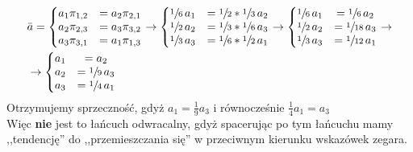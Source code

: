 \begin{align*}
&\bar{a}=\left\{\begin{matrix}
a_1\pi _{1,2} &= a_2\pi _{2,1}\\
a_2\pi _{2,3} &= a_3\pi _{3,2}\\
a_3\pi _{3,1} &= a_1\pi _{1,3}
\end{matrix}\right. \rightarrow \left\{\begin{matrix}
\sfrac{1}{6}\,a_1 &= \sfrac{1}{2}*\sfrac{1}{3}\,a_2\\
\sfrac{1}{2}\,a_2 &= \sfrac{1}{3}*\sfrac{1}{6}\,a_3\\
\sfrac{1}{3}\,a_3 &= \sfrac{1}{6}*\sfrac{1}{2}\,a_1
\end{matrix}\right. \rightarrow \left\{\begin{matrix}
\sfrac{1}{6}\,a_1 &= \sfrac{1}{6}\,a_2\\
\sfrac{1}{2}\,a_2 &= \sfrac{1}{18}\,a_3\\
\sfrac{1}{3}\,a_3 &= \sfrac{1}{12}\,a_1
\end{matrix}\right.\rightarrow \\
&\rightarrow \left\{\begin{matrix}
a_1 &= a_2\\
a_2 &= \sfrac{1}{9}\,a_3\\
a_3 &= \sfrac{1}{4}\,a_1
\end{matrix}\right.
\end{align*}
Otrzymujemy sprzeczność, gdyż  $a_1 = \frac{1}{9}a_3$ i równocześnie $\frac{1}{4}a_1 = a_3$\\
Więc \textbf{nie} jest to łańcuch odwracalny, gdyż spacerując po tym łańcuchu mamy ,,tendencję'' do ,,przemieszczania się'' w przeciwnym kierunku wskazówek zegara.

